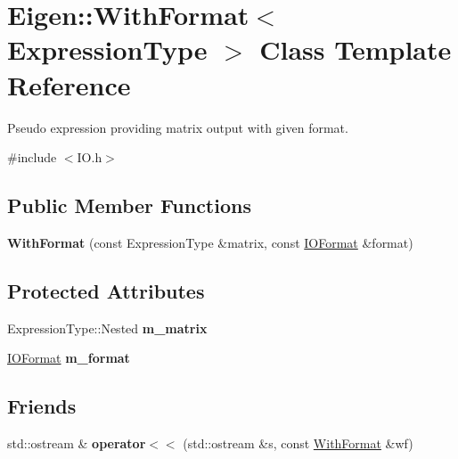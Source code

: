 \hypertarget{class_eigen_1_1_with_format}{}\section{Eigen\+::With\+Format$<$ Expression\+Type $>$ Class Template Reference}
\label{class_eigen_1_1_with_format}


Pseudo expression providing matrix output with given format.  




{\ttfamily \#include $<$I\+O.\+h$>$}

\subsection*{Public Member Functions}
\begin{DoxyCompactItemize}
\item 
\mbox{\label{class_eigen_1_1_with_format_a083ccb57d6df16a5b73f51f934d75461}} 
{\bfseries With\+Format} (const Expression\+Type \&matrix, const \mbox{\hyperlink{struct_eigen_1_1_i_o_format}{I\+O\+Format}} \&format)
\end{DoxyCompactItemize}
\subsection*{Protected Attributes}
\begin{DoxyCompactItemize}
\item 
\mbox{\label{class_eigen_1_1_with_format_a69db3a905bba3e50286f404963da66ac}} 
Expression\+Type\+::\+Nested {\bfseries m\+\_\+matrix}
\item 
\mbox{\label{class_eigen_1_1_with_format_a126f79fba73b54bd82cedefe5883d600}} 
\mbox{\hyperlink{struct_eigen_1_1_i_o_format}{I\+O\+Format}} {\bfseries m\+\_\+format}
\end{DoxyCompactItemize}
\subsection*{Friends}
\begin{DoxyCompactItemize}
\item 
\mbox{\label{class_eigen_1_1_with_format_a817e230f591824ed812374d2da12f57b}} 
std\+::ostream \& {\bfseries operator$<$$<$} (std\+::ostream \&s, const \mbox{\hyperlink{class_eigen_1_1_with_format}{With\+Format}} \&wf)
\end{DoxyCompactItemize}


